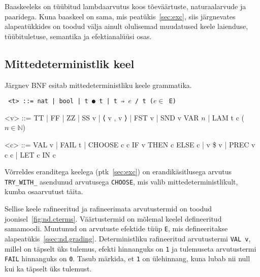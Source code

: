 \documentclass[a4paper,12pt]{article}
\begin{document}
Baaskeeleks on tüübitud lambdaarvutus koos tõeväärtuste, naturaalarvude ja paaridega.
Kuna baaskeel on sama, mis peatükis~\ref{sec:exc}, siis järgnevates alapeatükkides on toodud välja ainult olulisemad muudatused keele laienduse, tüübituletuse, semantika ja efektianalüüsi osas.


\subsection{Mittedeterministlik keel}

Järgnev BNF esitab mittedeterministliku keele grammatika.
\begin{adjustwidth}{1em}{0pt}
\begin{grammar}\tt
<t> ::= nat | bool | t ● t | t ⇒ $e$ / t \hfill ($e \in$ E)
  
<v> ::= TT | FF | ZZ | SS v | ⟨ v , v ⟩ | FST v | SND v
    \alt VAR $n$ | LAM t c \hfill ($n \in \mathbb N$)
  
<c> ::= VAL v | FAIL t | CHOOSE c c
    \alt IF v THEN c ELSE c | v \$ v | PREC v c c | LET c IN c
\end{grammar}
\end{adjustwidth}

Võrreldes eranditega keelega (ptk~\ref{sec:exc}) on erandikäsitlusega arvutus {\tt TRY_WITH_} asendunud arvutusega {\tt CHOOSE}, mis valib mittedeterministlikult, kumba osaarvutust täita.

Sellise keele rafineeritud ja rafineerimata arvutustermid on toodud joonisel~\ref{fig:nd.cterms}.
Väärtustermid on mõlemal keelel defineeritud samamoodi.
Muutunud on arvutuste efektide tüüp {\tt E}, mis defineeritakse alapeatükis~\ref{ssec:nd.grading}.
Deterministliku rafineeritud arvutustermi {\tt VAL v}, millel on täpselt üks tulemus, efekti hinnanguks on {\tt 1} ja tulemuseta arvutustermi {\tt FAIL} hinnanguks on {\tt 0}.
Tasub märkida, et {\tt 1} on ülehinnang, kuna lubab nii null kui ka täpselt üks tulemust.
\end{document}
